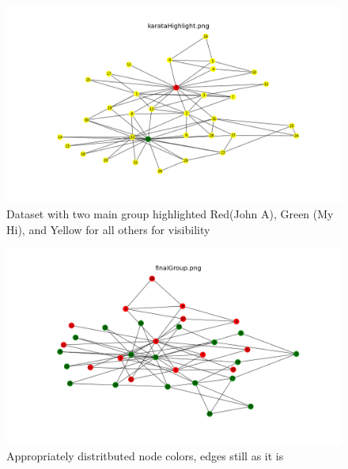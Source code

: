 \documentclass[12pt]{article}
\begin{document}
\begin{figure}[H]
\centering
\includegraphics[trim=0 0 0 0, clip, width=\textwidth] {karataHighlight.png}
\caption{Dataset with two main  group highlighted Red(John A), Green (My Hi), and Yellow for all others for visibility }
\label{fig:q1v}
\end{figure}
\begin{figure}[H]
\centering
\includegraphics[trim=0 0 0 0, clip, width=\textwidth] {finalGroup.png}
\caption{Appropriately distritbuted node colors, edges still as it is}
\label{fig:q1d}
\end{figure}


\emph{}
\end{document}
